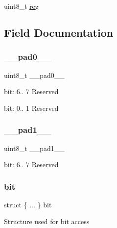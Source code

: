\begin{DoxyCompactItemize}
\begin{tabbing}
\end{tabbing}\item 
uint8\+\_\+t \mbox{\hyperlink{union_i2_s___c_t_r_l_a___type_a9428adc9af4653a2050e2536b55dec8d}{reg}}
\end{DoxyCompactItemize}


\subsection{Field Documentation}
\mbox{\label{union_i2_s___c_t_r_l_a___type_a8b4eebe79ded0459acec2f4950102ba3}} 
\subsubsection{\texorpdfstring{\_\_pad0\_\_}{\_\_pad0\_\_}}
{\footnotesize\ttfamily uint8\+\_\+t \+\_\+\+\_\+pad0\+\_\+\+\_\+}

bit\+: 6.. 7 Reserved

bit\+: 0.. 1 Reserved \mbox{\label{union_i2_s___c_t_r_l_a___type_a77f12d2e278bd5c07712648ac0df5e08}} 
\subsubsection{\texorpdfstring{\_\_pad1\_\_}{\_\_pad1\_\_}}
{\footnotesize\ttfamily uint8\+\_\+t \+\_\+\+\_\+pad1\+\_\+\+\_\+}

bit\+: 6.. 7 Reserved \mbox{\label{union_i2_s___c_t_r_l_a___type_a03dd63cae1304bcb4ba3e87c7bbccdaa}} 
\subsubsection{\texorpdfstring{bit}{bit}}
{\footnotesize\ttfamily struct \{ ... \}   bit}

Structure used for bit access \mbox{\label{union_i2_s___c_t_r_l_a___type_a022d2f8cbe4ee8518af036666e0fd370}} 
